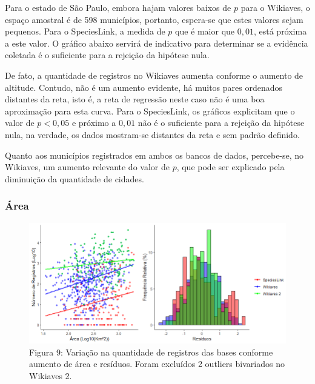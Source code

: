\documentclass[12pt]{extarticle}
\newenvironment{resposta}{ \color{mygray}}{}
\begin{document}
\begin{resposta}
Para o estado de São Paulo, embora hajam valores baixos de $p$ para o Wikiaves, o espaço amostral é de 598 municípios, portanto, espera-se que estes valores sejam pequenos. Para o SpeciesLink, a medida de $p$ que é maior que $0,01$, está próxima a este valor. O gráfico abaixo servirá de indicativo para determinar se a evidência coletada é o suficiente para a rejeição da hipótese nula.

De fato, a quantidade de registros no Wikiaves aumenta conforme o aumento de altitude. Contudo, não é um aumento evidente, há muitos pares ordenados distantes da reta, isto é, a reta de regressão neste caso não é uma boa aproximação para esta curva. Para o SpeciesLink, os gráficos explicitam que o valor de $p < 0,05$ e próximo a $0,01$ não é o suficiente para a rejeição da hipótese nula, na verdade, os dados mostram-se distantes da reta e sem padrão definido.

Quanto aos municípios registrados em ambos os bancos de dados, percebe-se, no Wikiaves, um aumento relevante do valor de $p$, que pode ser explicado pela diminuição da quantidade de cidades. 
\end{resposta}



\subsubsection{Área}


\begin{figure}[h!]
\centering
\includegraphics[width = 15cm]{Imagens/G02.png}
\\{\scriptsize Figura 9: Variação na quantidade de registros das bases conforme aumento de área e resíduos. Foram excluídos  2 outliers bivariados no Wikiaves 2.}
\end{figure}
\end{document}
